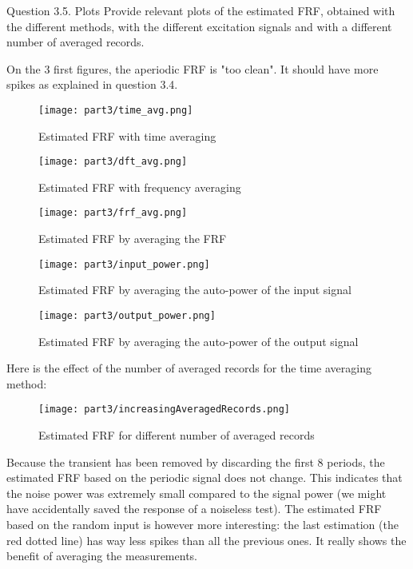 \begin{Task}{Question 3.5. Plots}
    Provide relevant plots of the estimated FRF, obtained with the different methods, with the different excitation signals and with a different number of averaged records.
\end{Task}

On the 3 first figures, the aperiodic FRF is "too clean". It should have more spikes as explained in question 3.4.

\begin{figure}[H]
    \centering
    \texttt{[image: part3/time\_avg.png]}
    \caption{Estimated FRF with time averaging}
\end{figure}

\begin{figure}[H]
    \centering
    \texttt{[image: part3/dft\_avg.png]}
    \caption{Estimated FRF with frequency averaging}
\end{figure}

\begin{figure}[H]
    \centering
    \texttt{[image: part3/frf\_avg.png]}
    \caption{Estimated FRF by averaging the FRF}
\end{figure}

\begin{figure}[H]
    \centering
    \texttt{[image: part3/input\_power.png]}
    \caption{Estimated FRF by averaging the auto-power of the input signal}
\end{figure}

\begin{figure}[H]
    \centering
    \texttt{[image: part3/output\_power.png]}
    \caption{Estimated FRF by averaging the auto-power of the output signal}
\end{figure}

Here is the effect of the number of averaged records for the time averaging method:

\begin{figure}[H]
    \centering
    \texttt{[image: part3/increasingAveragedRecords.png]}
    \caption{Estimated FRF for different number of averaged records}
\end{figure}

Because the transient has been removed by discarding the first 8 periods, the estimated FRF based on the periodic signal does not change. This indicates that the noise power was extremely small compared to the signal power (we might have accidentally saved the response of a noiseless test). The estimated FRF based on the random input is however more interesting: the last estimation (the red dotted line) has way less spikes than all the previous ones. It really shows the benefit of averaging the measurements.


